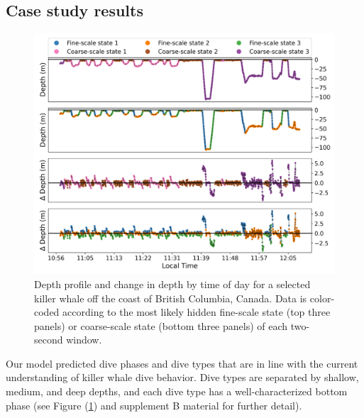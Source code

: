\subsection{Case study results}
%
\begin{figure}
    \centering
    \includegraphics[width=5in]{plt/decoded_dives_kw_I107_K_3_3_nWhales_8.png}
    \caption{Depth profile and change in depth by time of day for a selected killer whale off the coast of British Columbia, Canada. Data is color-coded according to the most likely hidden fine-scale state (top three panels) or coarse-scale state (bottom three panels) of each two-second window.}
    \label{fig:data}
\end{figure}
%
Our model predicted dive phases and dive types that are in line with the current understanding of killer whale dive behavior. Dive types are separated by shallow, medium, and deep depths, and each dive type has a well-characterized bottom phase (see Figure (\ref{fig:data}) and supplement B material for further detail).

